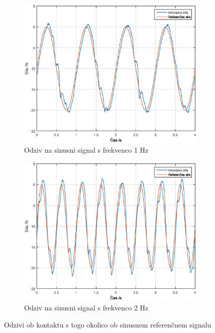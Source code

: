 \documentclass[a4paper]{article}
\begin{document}
\begin{figure}[!ht]
	\begin{subfigure}[b]{0.4\textwidth}
		\includegraphics[width=\textwidth]{./slike/figure_10_hz.eps}
		\caption{Odziv na sinusni signal s frekvenco 1 Hz}
	\end{subfigure}
	
	\begin{subfigure}[b]{0.4\textwidth}
		\includegraphics[width=\textwidth]{./slike/figure_20_hz.eps}
		\caption{Odziv na sinusni signal s frekvenco 2 Hz}
	\end{subfigure}
	
	\caption{Odzivi ob kontaktu s togo okolico ob sinusnem referenčnem signalu}
	\label{fig:sineref}
\end{figure}
\end{document}
